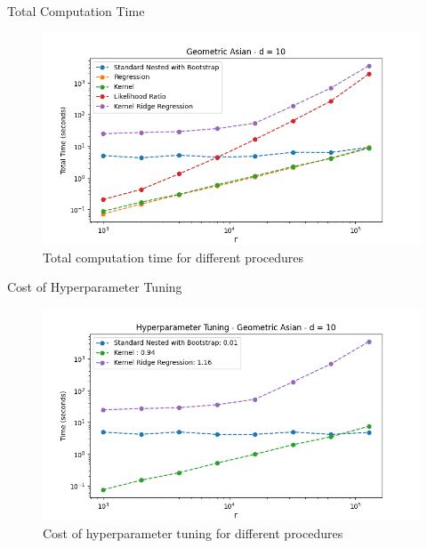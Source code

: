 \documentclass[9pt,handout]{beamer}
\begin{document}
\begin{frame}{Total Computation Time}

    \begin{figure}
        \includegraphics[width=\textwidth]{../project1/figures/figure11b.png}
        \caption{Total computation time for different procedures}
    \end{figure}

\end{frame}

\begin{frame}{Cost of Hyperparameter Tuning}

    \begin{figure}
        \includegraphics[width=\textwidth]{../project1/figures/figure12a.png}
        \caption{Cost of hyperparameter tuning for different procedures}
    \end{figure}

\end{frame}
\end{document}
